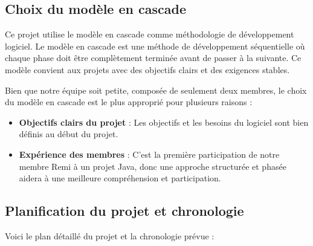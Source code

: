 \documentclass{article}
\begin{document}
\subsection{Choix du modèle en cascade}

Ce projet utilise le modèle en cascade comme méthodologie de développement logiciel. Le modèle en cascade est une méthode de développement séquentielle où chaque phase doit être complètement terminée avant de passer à la suivante. Ce modèle convient aux projets avec des objectifs clairs et des exigences stables.

Bien que notre équipe soit petite, composée de seulement deux membres, le choix du modèle en cascade est le plus approprié pour plusieurs raisons :
\begin{itemize}
    \item \textbf{Objectifs clairs du projet} : Les objectifs et les besoins du logiciel sont bien définis au début du projet.
    \item \textbf{Expérience des membres} : C'est la première participation de notre membre Remi à un projet Java, donc une approche structurée et phasée aidera à une meilleure compréhension et participation.
\end{itemize}

\subsection{Planification du projet et chronologie}

Voici le plan détaillé du projet et la chronologie prévue :
\end{document}
